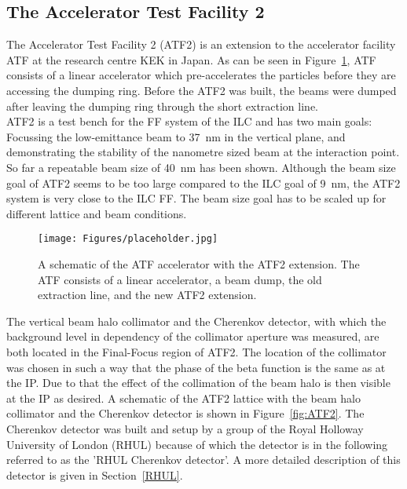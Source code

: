\subsection{The Accelerator Test Facility 2}
\label{ATF2}

The Accelerator Test Facility 2 (ATF2) is an extension to the accelerator facility ATF at the research centre KEK in Japan. As can be seen in Figure~\ref{fig:ATF}, ATF consists of a linear accelerator which pre-accelerates the particles before they are accessing the dumping ring. Before the ATF2 was built, the beams were dumped after leaving the dumping ring through the short extraction line.\\ATF2 is a test bench for the FF system of the ILC and has two main goals: Focussing the low-emittance beam to \SI{37}{\nano\metre} in the vertical plane, and demonstrating the stability of the nanometre sized beam at the interaction point. So far a repeatable beam size of \SI{40}{\nano\metre} has been shown. Although the beam size goal of ATF2 seems to be too large compared to the ILC goal of \SI{9}{\nano\metre}, the ATF2 system is very close to the ILC FF. The beam size goal has to be scaled up for different lattice and beam conditions.

\begin{figure}
\centering
\texttt{[image: Figures/placeholder.jpg]}%
\caption[ATF accelerator]{A schematic of the ATF accelerator with the ATF2 extension. The ATF consists of a linear accelerator, a beam dump, the old extraction line, and the new ATF2 extension.}%
\label{fig:ATF}
\end{figure}

The vertical beam halo collimator and the Cherenkov detector, with which the background level in dependency of the collimator aperture was measured, are both located in the Final-Focus region of ATF2. The location of the collimator was chosen in such a way that the phase of the beta function is the same as at the IP. Due to that the effect of the collimation of the beam halo is then visible at the IP as desired. A schematic of the ATF2 lattice with the beam halo collimator and the Cherenkov detector is shown in Figure~\ref{fig:ATF2}. The Cherenkov detector was built and setup by a group of the Royal Holloway University of London (RHUL) because of which the detector is in the following referred to as the 'RHUL Cherenkov detector'. A more detailed description of this detector is given in Section~\ref{RHUL}.

